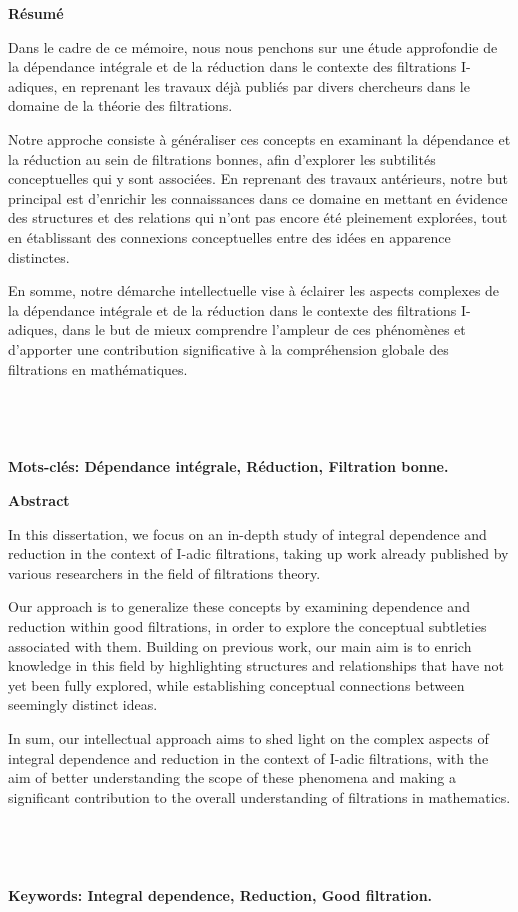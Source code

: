 \newpage
{}
\begin{center}
	\LARGE{\textbf{Résumé}}
\end{center}

Dans le cadre de ce mémoire, nous nous penchons sur une étude approfondie de la dépendance intégrale et de la réduction dans le contexte des filtrations I-adiques, en reprenant les travaux déjà publiés par divers chercheurs dans le domaine de la théorie des filtrations.

Notre approche consiste à généraliser ces concepts en examinant la dépendance et la réduction au sein de filtrations bonnes, afin d'explorer les subtilités conceptuelles qui y sont associées. En reprenant des travaux antérieurs, notre but principal est d'enrichir les connaissances dans ce domaine en mettant en évidence des structures et des relations qui n'ont pas encore été pleinement explorées, tout en établissant des connexions conceptuelles entre des idées en apparence distinctes.

En somme, notre démarche intellectuelle vise à éclairer les aspects complexes de la dépendance intégrale et de la réduction dans le contexte des filtrations I-adiques, dans le but de mieux comprendre l'ampleur de ces phénomènes et d'apporter une contribution significative à la compréhension globale des filtrations en mathématiques.
\\
\\
\\
\\
\\
\textbf{Mots-clés: Dépendance intégrale, Réduction, Filtration bonne.} 



\newpage
{}
\begin{center}
	\LARGE{\textbf{Abstract}}
\end{center}

In this dissertation, we focus on an in-depth study of integral dependence and reduction in the context of I-adic filtrations, taking up work already published by various researchers in the field of filtrations theory.

Our approach is to generalize these concepts by examining dependence and reduction within good filtrations, in order to explore the conceptual subtleties associated with them. Building on previous work, our main aim is to enrich knowledge in this field by highlighting structures and relationships that have not yet been fully explored, while establishing conceptual connections between seemingly distinct ideas.

In sum, our intellectual approach aims to shed light on the complex aspects of integral dependence and reduction in the context of I-adic filtrations, with the aim of better understanding the scope of these phenomena and making a significant contribution to the overall understanding of filtrations in mathematics.
\\
\\
\\
\\
\\
\textbf{Keywords: Integral dependence, Reduction, Good filtration.} 

